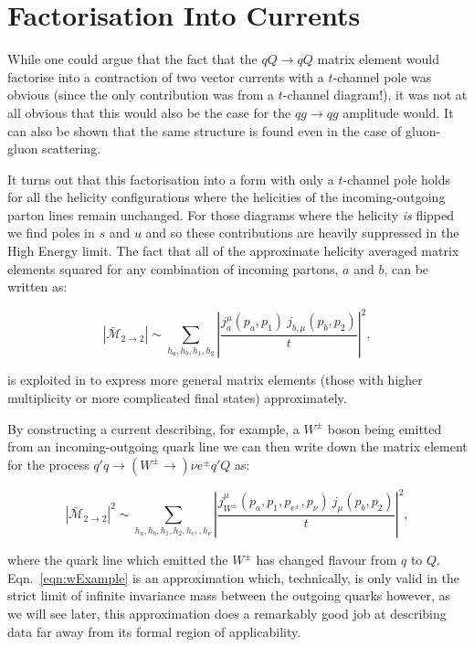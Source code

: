 	\section{Factorisation Into Currents}
		\label{sec:currents}

		While one could argue that the fact that the $qQ\to qQ$ matrix element would factorise into a
		contraction of two vector currents with a $t$-channel pole was obvious (since the only
		contribution was from a $t$-channel diagram!), it was not at all obvious that this
		would also be the case for the $qg\to qg$ amplitude would.  It can also be shown that
		the same structure is found even in the case of gluon-gluon scattering\cite{Andersen:2011hs}.

		It turns out that this factorisation into a form with only a $t$-channel pole holds for
		all the helicity configurations where the helicities of the incoming-outgoing parton lines
		remain unchanged.  For those diagrams where the helicity \emph{is} flipped we find poles
		in $s$ and $u$ and so these contributions are heavily suppressed in the High Energy limit.
		The fact that all of the approximate helicity averaged matrix elements squared for any combination
		of incoming partons, $a$ and $b$, can be written as:

		\begin{equation}
			|\bar{\mathcal{M}}_{2\to2}| \sim \sum_{h_a, h_b, h_1, h_2}
			\left|\frac{j^\mu_a(p_a, p_1)\ j_{b, \mu}(p_b, p_2)}{t}\right|^2,
		\end{equation}

		is exploited in \hej to express more general matrix elements (those with higher multiplicity or
		more complicated final states) approximately.

		By constructing a current describing, for example, a $W^\pm$ boson being emitted from an
		incoming-outgoing quark line we can then write down the matrix element for the process
		$q'q\to(W^\pm\to)\nu e^\pm q'Q$ as:

		\begin{equation}
			|\bar{\mathcal{M}}_{2\to2}|^2 \sim \sum_{h_a, h_b, h_1, h_2, h_{e^\pm}, h_\nu}
			\left|\frac{j^\mu_{W^\pm}(p_a, p_1, p_{e^\pm}, p_\nu)\ j_\mu(p_b, p_2)}{t}\right|^2,
			\label{eqn:wExample}
		\end{equation}

		where the quark line which emitted the $W^\pm$ has changed flavour from $q$ to $Q$.  Eqn.~\eqref{eqn:wExample}
		is an approximation which, technically, is only valid in the strict limit of infinite invariance mass between
		the outgoing quarks however, as we will see later, this approximation does a remarkably good job at
		describing data far away from its formal region of applicability.

